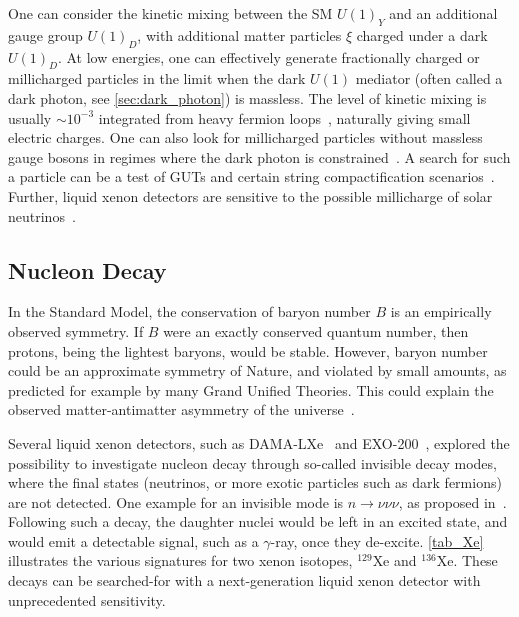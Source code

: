 One can consider the kinetic mixing between the SM $U(1)_Y$ and an additional gauge group $U(1)_D$, with additional matter particles $\xi$ charged under a dark $U(1)_D$. At low energies, one can effectively generate fractionally charged or millicharged particles in the limit when the dark $U(1)$ mediator (often called a dark photon, see \autoref{sec:dark_photon}) is massless. The level of kinetic mixing is usually $\sim 10^{-3}$ integrated from heavy fermion loops~\cite{Holdom:1985ag}, naturally giving small electric charges. One can also look for millicharged particles without massless gauge bosons in regimes where the dark photon is constrained~\cite{Kelly:2018brz}. A search for such a particle can be a test of GUTs and certain string compactification scenarios~\cite{Shiu:2013wxa}. Further, liquid xenon detectors are sensitive to the possible millicharge of solar neutrinos~\cite{Abe:2020nwr}.

\subsection{Nucleon Decay} 

In the Standard Model, the conservation of baryon number $B$ is an empirically observed symmetry. If $B$ were an exactly conserved quantum number, then protons, being the lightest baryons, would be stable. However, baryon number could be an approximate symmetry of Nature, and violated by small amounts, as predicted for example by many Grand Unified Theories. This could explain the observed matter-antimatter asymmetry of the universe~\cite{Babu:2013jba}. 

Several liquid xenon detectors, such as DAMA-LXe~\cite{Bernabei:2000xp,Bernabei:2006tw} and EXO-200~\cite{Albert:2017qto}, explored the possibility to investigate nucleon decay through so-called invisible decay modes, where the final states (neutrinos, or more exotic particles such as dark fermions) are not detected. One example for an invisible mode is $n \rightarrow \nu\nu\nu$, as proposed in~\cite{Mohapatra:2002ug}. Following such a decay, the daughter nuclei would be left in an excited state, and would emit a detectable signal, such as a $\gamma$-ray, once they de-excite. \autoref{tab_Xe} illustrates the various signatures for two xenon isotopes, $^{129}$Xe and $^{136}$Xe. These decays can be searched-for with a next-generation liquid xenon detector with unprecedented sensitivity.

